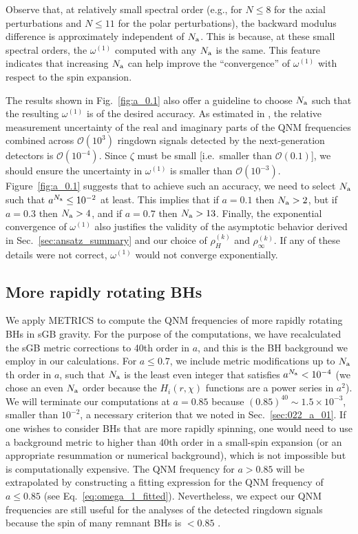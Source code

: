 \documentclass[aps,prx,amsmath,floats,floatfix,twocolumn,
  superscriptaddress,nofootinbib,showpacs]{revtex4-1}
\begin{document}
Observe that, at relatively small spectral order (e.g., for $N \leq 8$ for the axial perturbations and $N \leq 11$ for the polar perturbations), the backward modulus difference is approximately independent of $N_{\rm a}$. 
This is because, at these small spectral orders, the $\omega^{(1)}$ computed with any $N_{\rm a}$ is the same. 
This feature indicates that increasing $N_{\rm a}$ can help improve the ``convergence'' of $\omega^{(1)}$ with respect to the spin expansion. 

The results shown in Fig.~\ref{fig:a_0.1} also offer a guideline to choose $N_{\rm a}$ such that the resulting $\omega^{(1)}$ is of the desired accuracy. 
As estimated in \cite{Maselli:2023khq}, the relative measurement uncertainty of the real and imaginary parts of the QNM frequencies combined across $\mathcal{O}(10^3)$ ringdown signals detected by the next-generation detectors is $\mathcal{O}(10^{-4})$. 
Since $\zeta$ must be small [i.e.~smaller than $\mathcal{O}(0.1)$], we should ensure the uncertainty in $\omega^{(1)}$ is smaller than $\mathcal{O}(10^{-3})$. 
Figure~\ref{fig:a_0.1} suggests that to achieve such an accuracy, we need to select $N_{\rm a}$ such that $a^{N_{\rm a}} \leq 10^{-2} $ at least. This implies that if $a = 0.1$ then $N_{\rm a} > 2$, but if $a=0.3$ then $N_{\rm a}>4$, and if $a = 0.7$ then $N_{\rm a} > 13$.  
Finally, the exponential convergence of $\omega^{(1)}$ also justifies the validity of the asymptotic behavior derived in Sec.~\ref{sec:ansatz_summary} and our choice of $\rho_H^{(k)}$ and $\rho_{\infty}^{(k)}$. 
If any of these details were not correct, $\omega^{(1)}$ would not converge exponentially. 

\subsection{More rapidly rotating BHs}
\label{sec:Rotating_BHs_results}

We apply METRICS to compute the QNM frequencies of more rapidly rotating BHs in sGB gravity. 
For the purpose of the computations, we have recalculated the sGB metric corrections to 40th order in $a$, and this is the BH background we employ in our calculations. 
For $a \leq 0.7$, we include metric modifications up to $N_{\rm a}$th order in $a$, such that $N_{\rm a}$ is the least even integer that satisfies $a^{N_{\rm a}} < 10^{-4}$ (we chose an even $N_{\rm a}$ order because the $H_i (r, \chi)$ functions are a power series in $a^2$).
We will terminate our computations at $a=0.85$ because $(0.85)^{40} \sim 1.5 \times 10^{-3}$, smaller than $10^{-2}$, a necessary criterion that we noted in Sec.~\ref{sec:022_a_01}. If one wishes to consider BHs that are more rapidly spinning, one would need to use a background metric to higher than 40th order in a small-spin expansion (or an appropriate resummation or numerical background), which is not impossible but is computationally expensive.
The QNM frequency for $a > 0.85$ will be extrapolated by constructing a fitting expression for the QNM frequency of $a \leq 0.85 $ (see Eq.~\eqref{eq:omega_1_fitted}). 
Nevertheless, we expect our QNM frequencies are still useful for the analyses of the detected ringdown signals because the spin of many remnant BHs is $< 0.85$ \cite{LIGOScientific:2016vlm, LIGO_07, LIGO_11}. 
\end{document}
